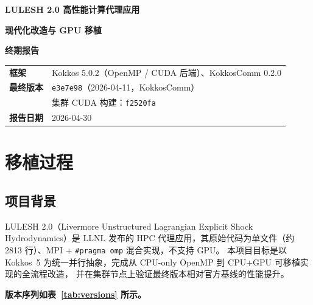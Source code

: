 \documentclass[UTF8,12pt,a4paper]{ctexart}
\begin{document}
\begin{titlepage}
\centering
\vspace*{2.5cm}
{\LARGE\bfseries LULESH 2.0 高性能计算代理应用\par}
\vspace{0.4em}
{\LARGE\bfseries 现代化改造与 GPU 移植\par}
\vspace{0.4em}
{\LARGE\bfseries 终期报告\par}
\vspace{2.5cm}
\begin{tabular}{@{}ll}
  \textbf{框架} & Kokkos 5.0.2（OpenMP / CUDA 后端）、KokkosComm 0.2.0 \\[0.6em]
  \textbf{最终版本} & \texttt{e3e7e98}（2026-04-11，KokkosComm） \\
                    & 集群 CUDA 构建：\texttt{f2520fa} \\[0.6em]
  \textbf{报告日期} & 2026-04-30 \\
\end{tabular}
\vfill
\end{titlepage}

\tableofcontents
\newpage

\section{移植过程}

\subsection{项目背景}

LULESH 2.0（Livermore Unstructured Lagrangian Explicit Shock Hydrodynamics）是 LLNL 发布的 HPC
代理应用，其原始代码为单文件（约 2813 行）、MPI + \texttt{\#pragma omp} 混合实现，不支持 GPU。
本项目目标是以 Kokkos~5 为统一并行抽象，完成从 CPU-only OpenMP 到 CPU+GPU 可移植实现的全流程改造，
并在集群节点上验证最终版本相对官方基线的性能提升。

\textbf{版本序列如表~\ref{tab:versions} 所示。}
\end{document}
